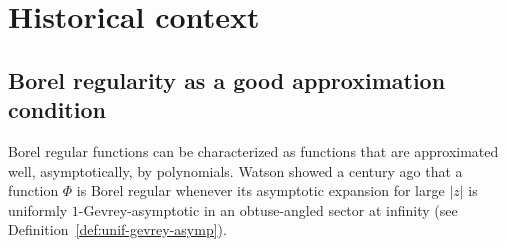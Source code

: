 \documentclass{article}
\theoremstyle{definition}
\theoremstyle{plain}
\begin{document}
\section{Historical context}\label{sec:historical-context}
%
\subsection{Borel regularity as a good approximation condition}
Borel regular functions can be characterized as functions that are approximated well, asymptotically, by polynomials. Watson showed a century ago \cite[Part II, Section 9]{watson2} that a function $\Phi$ is Borel regular whenever its asymptotic expansion for large $|z|$ is uniformly $1$-Gevrey-asymptotic in an obtuse-angled sector at infinity (see Definition~\ref{def:unif-gevrey-asymp}).
\end{document}
